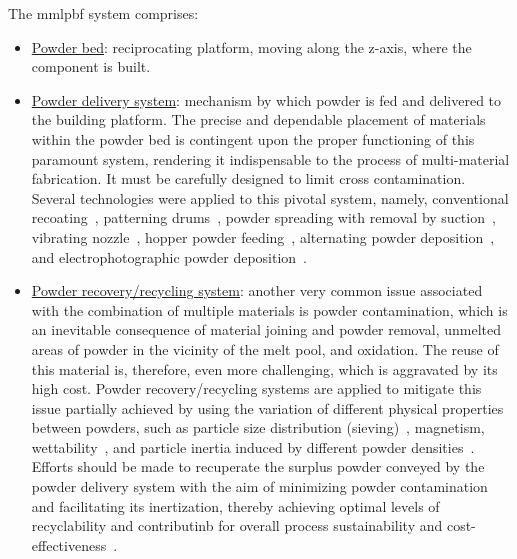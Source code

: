   The \gls{mmlpbf} system comprises:
  \begin{itemize}
  \item \underline{Powder bed}: reciprocating platform, moving along the z-axis,
    where the component is built.
  \item \underline{Powder delivery system}: mechanism by which powder is fed and
    delivered to the building platform.
    The precise and dependable placement of materials within the powder bed is
    contingent upon the proper functioning of this paramount system, rendering
    it indispensable to the process of multi-material fabrication. It must be
    carefully designed to limit cross contamination. Several technologies were
    applied to this pivotal system, namely, conventional
    recoating~\cite{bai2020dual, koopmann2019additive}, patterning
    drums~\cite{aerosintPatternDrum2019}, powder spreading with removal by
    suction~\cite{schneck2022capability, bareth2022Implem,
      bartolomeu2020additive, marques2022RocketEngine}, vibrating
    nozzle~\cite{zhang2019integrated, wei2019additive, demir2017multi}, hopper
    powder feeding~\cite{walker2022multi, auroraLabsRMP1}, alternating powder
    deposition~\cite{wang2022multi}, and electrophotographic powder
    deposition~\cite{stichel2020electrophotographic, foerster2020aspects,
      benning2018proof, stichel2018electrophotographic}.
  \item \underline{Powder recovery/recycling system}: another very common issue
    associated with the combination of multiple materials is
powder contamination, which is an inevitable consequence of material joining and
powder removal, unmelted areas of powder in the vicinity of the melt pool,
and oxidation. The reuse of this material is, therefore, even more challenging,
which is aggravated by its high cost. Powder recovery/recycling systems are applied to
mitigate this issue partially achieved by using the
variation of different physical properties between powders, such as particle size
distribution (sieving)~\cite{chivel2016new},  magnetism\cite{seidel2018status},
wettability~\cite{woidasky2017recyclingtechnik}, and particle inertia induced by
different powder densities~\cite{ullrich2013mechanische}.
    Efforts should be made to recuperate the surplus powder conveyed by the
    powder delivery system with the aim of minimizing powder contamination and
    facilitating its inertization, thereby achieving optimal levels of
    recyclability and contributinb for overall process sustainability and cost-effectiveness~\cite{obeidi2022LPBFGuidelines}.

\end{itemize}
